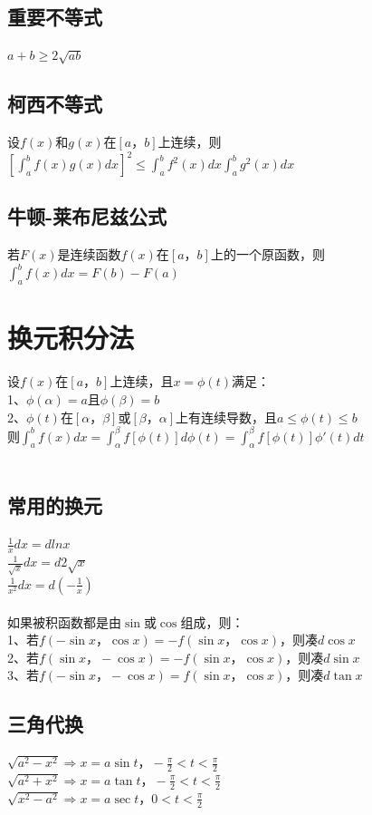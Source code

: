 \documentclass{article}
\begin{document}
\begin{flushleft}
	\subsection{重要不等式}
	$a+b\ge 2\sqrt{ab}$\\
	\subsection{柯西不等式}
	设$f(x)$和$g(x)$在$[a，b]$上连续，则$[\int_{a}^{b}f(x)g(x)dx]^2\le \int_{a}^{b}f^2(x)dx\int_{a}^{b}g^2(x)dx$\\
	\subsection{牛顿-莱布尼兹公式}
	若$F(x)$是连续函数$f(x)$在$[a，b]$上的一个原函数，则$\int_{a}^{b}f(x)dx=F(b)-F(a)$\\
	
	\section{换元积分法}
	
	设$f(x)$在$[a，b]$上连续，且$x=\phi(t)$满足：\\
	1、$\phi(\alpha)=a$且$\phi(\beta)=b$\\
	2、$\phi(t)$在$[\alpha，\beta]$或$[\beta，\alpha]$上有连续导数，且$a\le \phi(t)\le b$\\
	则$\int_{a}^{b}f(x)dx=\int_{\alpha}^{\beta}f[\phi(t)]d\phi(t)=\int_{\alpha}^{\beta}f[\phi(t)]\phi'(t)dt$\\
	~\\
	\subsection{常用的换元}
	$\frac{1}{x}dx=dlnx$\\
	$\frac{1}{\sqrt{x}}dx=d2\sqrt{x}$\\
	$\frac{1}{x^2}dx=d(-\frac{1}{x})$\\
	~\\
	如果被积函数都是由$\sin$或$\cos$组成，则：\\
	1、若$f(-\sin x，\cos x)=-f(\sin x，\cos x)$，则凑$d\cos x$\\
	2、若$f(\sin x，-\cos x)=-f(\sin x，\cos x)$，则凑$d\sin x$\\
	3、若$f(-\sin x，-\cos x)=f(\sin x，\cos x)$，则凑$d\tan x$\\
	\subsection{三角代换}
	$\sqrt{a^2-x^2} \Rightarrow x=a\sin t， -\frac{\pi}{2}<t<\frac{\pi}{2}$\\
	$\sqrt{a^2+x^2} \Rightarrow x=a\tan t， -\frac{\pi}{2}<t<\frac{\pi}{2}$\\
	$\sqrt{x^2-a^2} \Rightarrow x=a\sec t， 0<t<\frac{\pi}{2}$\\

\end{flushleft}
\end{document}
